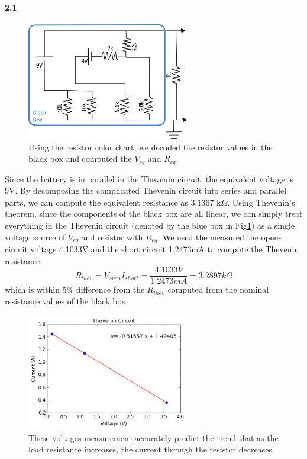 \documentclass[authoryear, 12pt,5p, times]{elsarticle}
\begin{document}
\paragraph{\textbf{2.1}}
\begin{figure}[h!]
\includegraphics[width=200pt]{figure/thev_setup}
\caption{Using the resistor color chart, we decoded the resistor values  in the black box and computed the $V_{eq}$ and $R_{eq}$.}
\label{thev_setup}
\end{figure}
Since the battery is in parallel in the Thevenin circuit, the equivalent voltage is 9V. By decomposing the complicated Thevenin circuit into series and parallel parts, we can compute the equivalent resistance as 3.1367 k$\Omega$. Using Thevenin's theorem, since the components of the black box are all linear, we can simply treat everything in the Thevenin circuit (denoted by the blue box in Fig\ref{thev_setup}) as a single voltage source of $V_{eq}$ and resistor with $R_{eq}$. We used the measured the open-circuit voltage 4.1033V and the short circuit 1.2473mA to compute the Thevenin resistance:
\begin{equation}
R_{thev} = {V_{open}}{I_{short}}= \frac{4.1033V}{1.2473mA}=3.2897k\Omega
\end{equation}
which is within 5\% difference from the $R_{thev}$ computed from the nominal resistance values of the black box.
\begin{figure}[h!]
\includegraphics[width=200pt]{figure/thevenin}
\caption{These voltages measurement accurately predict the trend that   as the load resistance increases, the current through the resistor decreases.}
\label{thevenin_plot}
\end{figure}
\end{document}

